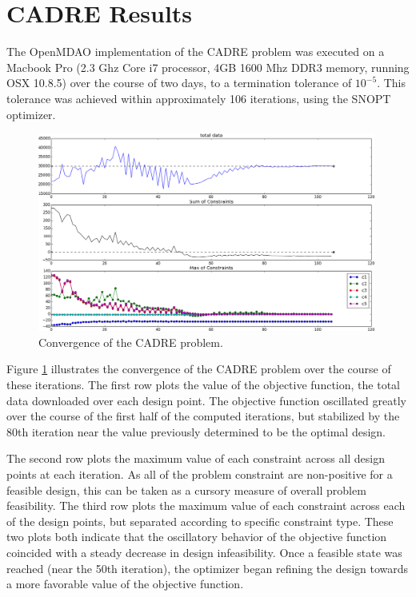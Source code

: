 \documentclass[]{aiaa-tc} %
\begin{document}
  \section{CADRE Results}

    The OpenMDAO implementation of the CADRE problem was executed on a 
    Macbook Pro (2.3 Ghz Core i7 processor, 4GB 1600 Mhz DDR3 memory, running OSX 10.8.5)
    over the course of two days, to a termination tolerance of $10^{-5}$. This tolerance
    was achieved within approximately 106 iterations, using the SNOPT\cite{gill2005snopt}
    optimizer.

    \begin{figure}
    \centering
    \includegraphics[width=0.99\textwidth]{images/opt.png}
    \caption[width=0.22\textwidth]{Convergence of the CADRE problem.}
    \label{convergence}
    \end{figure}


    Figure \ref{convergence} illustrates the convergence of the CADRE problem over the course of
    these iterations. The first row plots the
    value of the objective function, the total data downloaded over each design point. The objective
    function oscillated greatly over the course of the first half of the computed iterations, but
    stabilized by the 80th iteration near the value previously determined \cite{CADRE2012}
    to be the optimal design.

    The second row plots the maximum value of each constraint across all design points at
    each iteration. As all of the problem constraint are non-positive for a feasible design,
    this can be taken as a cursory measure of overall problem feasibility.
    The third row plots the maximum value of each constraint across each of the design points,
    but separated according to specific constraint type. These two plots both indicate that the
    oscillatory behavior of the objective function coincided with a steady decrease in design
    infeasibility. Once a feasible state was reached (near the 50th iteration), the optimizer
    began refining the design towards a more favorable value of the objective function.
\end{document}
